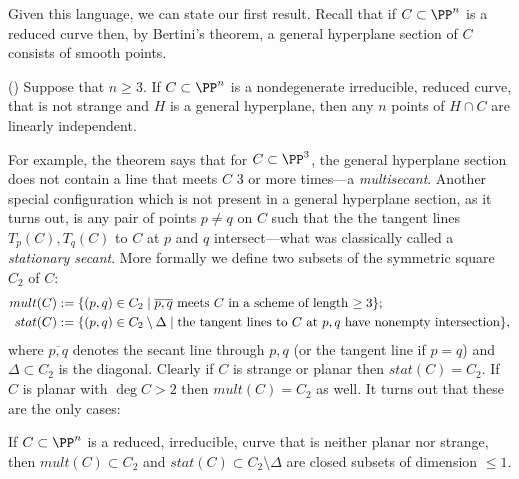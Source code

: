 Given this language, we can state our first result. Recall that if $C\subset \PP^n$ is a reduced curve then, by Bertini's theorem, a general hyperplane
section of $C$ consists of smooth points. 

\begin{theorem} \label{basic linear independence}(\cite[Lemma 1.1]{Rathmann})\label{linear general position}
Suppose that $n\geq 3$. If $C\subset \PP^n$ is a nondegenerate irreducible, reduced curve, that is not strange
and $H$ is a general hyperplane, then any $n$ points of $H\cap C$ are
linearly independent.
\end{theorem}

For example, the theorem says that for $C \subset \PP^3$, the general hyperplane section does not contain a line
that meets $C$ 3 or more times---a \emph{multisecant}. Another special configuration which is not present in a general hyperplane section, as it turns out,
is any pair of points $p\neq q$ on $C$ such that the the tangent lines $T_p(C), T_q(C)$ to $C$ at $p$ and $q$ intersect---what was classically
called a \emph{stationary secant}. More formally we define two subsets of the symmetric square $C_2$ of $C$:
$$
\begin{aligned}
 mult(C) &:=\{(p,q) \in C_2 \mid \overline{p,q} \hbox{ meets $C$ in a scheme of length $\geq 3$}\};\\
stat(C) &:= \{(p,q) \in C_2\setminus \Delta \mid  \hbox{the tangent lines to $C$ at $p,q$ have nonempty intersection}\},
\end{aligned}
$$
where $\overline{p,q}$ denotes the secant line through $p,q$ (or the tangent line if $p=q$) and $\Delta\subset C_2$
is the diagonal.
Clearly if $C$ is strange or planar then $stat(C) = C_2$. If $C$ is planar with $\deg C>2$ then $mult(C) = C_2$ as well.
It turns out that these are the only cases:

\begin{proposition}\label{mult and stat}
 If $C\subset \PP^n$ is a reduced, irreducible, curve that is neither planar nor strange, then $mult(C)\subset C_2$
 and $stat(C)\subset C_2\setminus \Delta$ are closed subsets of dimension $\leq 1$.
\end{proposition}

